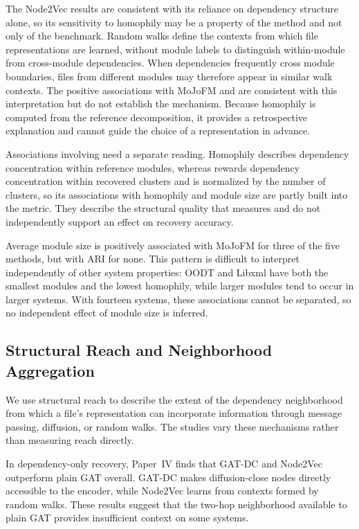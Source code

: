 The Node2Vec results are consistent with its reliance on dependency structure alone, so its sensitivity to homophily may be a property of the method and not only of the benchmark. Random walks define the contexts from which file representations are learned, without module labels to distinguish within-module from cross-module dependencies. When dependencies frequently cross module boundaries, files from different modules may therefore appear in similar walk contexts. The positive associations with MoJoFM and \tmq{} are consistent with this interpretation but do not establish the mechanism. Because homophily is computed from the reference decomposition, it provides a retrospective explanation and cannot guide the choice of a representation in advance.

Associations involving \tmq{} need a separate reading. Homophily describes dependency concentration within reference modules, whereas \tmq{} rewards dependency concentration within recovered clusters and is normalized by the number of clusters, so its associations with homophily and module size are partly built into the metric. They describe the structural quality that \tmq{} measures and do not independently support an effect on recovery accuracy.

Average module size is positively associated with MoJoFM for three of the five methods, but with ARI for none. This pattern is difficult to interpret independently of other system properties: OODT and Libxml have both the smallest modules and the lowest homophily, while larger modules tend to occur in larger systems. With fourteen systems, these associations cannot be separated, so no independent effect of module size is inferred.

\subsection{Structural Reach and Neighborhood Aggregation\label{sec:structural-reach}}
We use structural reach to describe the extent of the dependency neighborhood from which a file's representation can incorporate information through message passing, diffusion, or random walks. The studies vary these mechanisms rather than measuring reach directly.

In dependency-only recovery, Paper~IV finds that GAT-DC and Node2Vec outperform plain GAT overall. GAT-DC makes diffusion-close nodes directly accessible to the encoder, while Node2Vec learns from contexts formed by random walks. These results suggest that the two-hop neighborhood available to plain GAT provides insufficient context on some systems.

